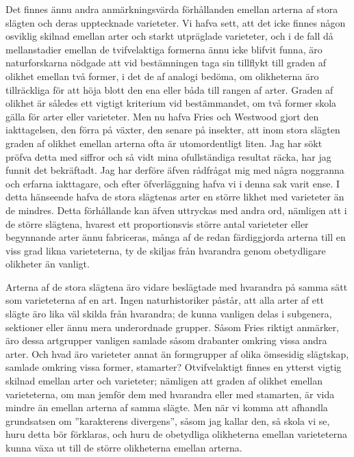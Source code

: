 Det finnes ännu andra anmärkningsvärda förhållanden emellan arterna af stora slägten och deras upptecknade varieteter. Vi hafva sett, att det icke finnes någon osviklig skilnad emellan arter och starkt utpräglade varieteter, och i de fall då mellanstadier emellan de tvifvelaktiga formerna ännu icke blifvit funna, äro naturforskarna nödgade att vid bestämningen taga sin tillflykt till graden af olikhet emellan två former, i det de af analogi bedöma, om olikheterna äro tillräckliga för att höja blott den ena eller båda till rangen af arter. Graden af olikhet är således ett vigtigt kriterium vid bestämmandet, om två former skola gälla för arter eller varieteter. Men nu hafva Fries och Westwood gjort den iakttagelsen, den förra på växter, den senare på insekter, att inom stora slägten graden af olikhet emellan arterna ofta är utomordentligt liten. Jag har sökt pröfva detta med siffror och så vidt mina ofullständiga resultat räcka, har jag funnit det bekräftadt. Jag har derföre äfven rådfrågat mig med några noggranna och erfarna iakttagare, och efter öfverläggning hafva vi i denna sak varit ense. I detta hänseende hafva de stora slägtenas arter en större likhet med varieteter än de mindres. Detta förhållande kan äfven uttryckas med andra ord, nämligen att i de större slägtena, hvarest ett proportionsvis större antal varieteter eller begynnande arter ännu fabriceras, många af de redan färdiggjorda arterna till en viss grad likna varieteterna, ty de skiljas från hvarandra genom obetydligare olikheter än vanligt.

Arterna af de stora slägtena äro vidare beslägtade med hvarandra på samma sätt som varieteterna af en art. Ingen naturhistoriker påstår, att alla arter af ett slägte äro lika väl skilda från hvarandra; de kunna vanligen delas i subgenera, sektioner eller ännu mera underordnade grupper. Såsom Fries riktigt anmärker, äro dessa artgrupper vanligen samlade såsom drabanter omkring vissa andra arter. Och hvad äro varieteter annat än formgrupper af olika ömsesidig slägtskap, samlade omkring vissa former, stamarter? Otvifvelaktigt finnes en ytterst vigtig skilnad emellan arter och varieteter; nämligen att graden af olikhet emellan varieteterna, om man jemför dem med hvarandra eller med stamarten, är vida mindre än emellan arterna af samma slägte. Men när vi komma att afhandla grundsatsen om ”karakterens divergens”, såsom jag kallar den, så skola vi se, huru detta bör förklaras, och huru de obetydliga olikheterna emellan varieteterna kunna växa ut till de större olikheterna emellan arterna.

